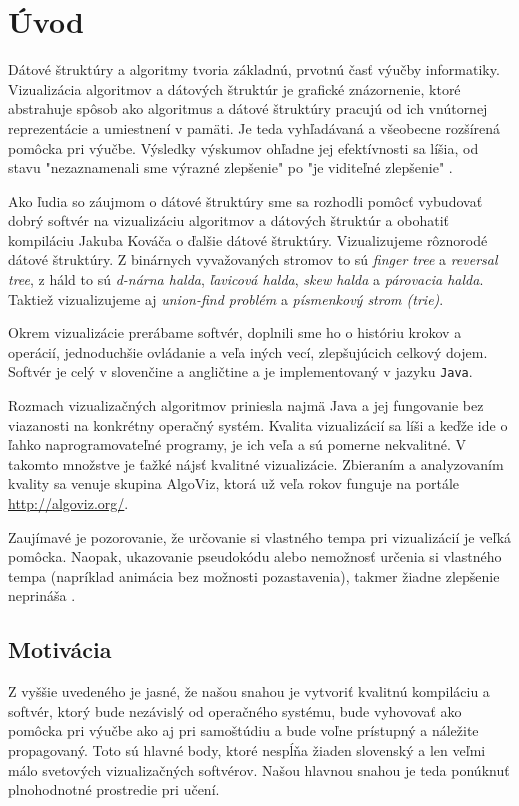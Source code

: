 \section{Úvod}
Dátové štruktúry a algoritmy tvoria základnú, prvotnú časť výučby 
informatiky. Vizualizácia algoritmov a dátových štruktúr je grafické 
znázornenie, ktoré abstrahuje spôsob ako algoritmus a dátové štruktúry 
pracujú od ich vnútornej reprezentácie a umiestnení v pamäti. Je teda 
vyhľadávaná a všeobecne rozšírená pomôcka pri výučbe. Výsledky výskumov 
ohľadne jej efektívnosti sa líšia, od stavu "nezaznamenali sme výrazné 
zlepšenie" po "je viditeľné zlepšenie" \citep{shaffer}.

Ako ľudia so záujmom o dátové štruktúry sme sa rozhodli pomôcť vybudovať 
dobrý softvér na vizualizáciu algoritmov a dátových štruktúr a obohatiť 
kompiláciu Jakuba Kováča \citep{kuko} o ďalšie dátové štruktúry. 
Vizualizujeme rôznorodé dátové štruktúry. Z binárnych vyvažovaných stromov 
to sú \emph{finger tree} a \emph{reversal tree}, z háld to sú \emph{d-nárna 
halda}, \emph{ľavicová halda}, \emph{skew halda} a \emph{párovacia halda}. 
Taktiež vizualizujeme aj \emph{union-find problém} a 
\emph{písmenkový strom (trie)}. 

Okrem vizualizácie prerábame softvér, doplnili sme ho o históriu krokov 
a operácií, jednoduchšie ovládanie a veľa iných vecí, zlepšujúcich 
celkový dojem. Softvér je celý v slovenčine a angličtine a je 
implementovaný v jazyku \texttt{Java}.

Rozmach vizualizačných algoritmov priniesla najmä Java a jej fungovanie 
bez viazanosti na konkrétny operačný systém. Kvalita vizualizácií sa líši 
a keďže ide o ľahko naprogramovateľné programy, je ich veľa a sú pomerne 
nekvalitné. V takomto množstve je ťažké nájsť kvalitné vizualizácie. 
Zbieraním a analyzovaním kvality sa venuje skupina AlgoViz, ktorá už 
veľa rokov funguje na portále \url{http://algoviz.org/}.

Zaujímavé je pozorovanie, že určovanie si vlastného tempa pri vizualizácií 
je veľká pomôcka. Naopak, ukazovanie pseudokódu alebo nemožnosť určenia si
vlastného tempa (napríklad animácia bez možnosti pozastavenia), takmer 
žiadne zlepšenie neprináša \citep{shaffer,saraiya}.

\subsection*{Motivácia}
Z vyššie uvedeného je jasné, že našou snahou je vytvoriť kvalitnú kompiláciu 
a softvér, ktorý bude nezávislý od operačného systému, bude vyhovovať ako 
pomôcka pri výučbe ako aj pri samoštúdiu a bude voľne prístupný a náležite 
propagovaný. Toto sú hlavné body, ktoré nespĺňa žiaden slovenský a 
len veľmi málo svetových vizualizačných softvérov. Našou hlavnou snahou 
je teda ponúknuť plnohodnotné prostredie pri učení.

